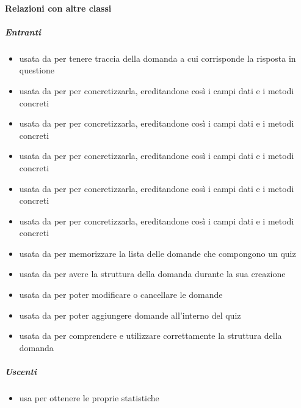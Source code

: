 \paragraph{Relazioni con altre classi}
\subparagraph{Entranti}
\begin{itemize}
\item usata da  per tenere traccia della domanda a cui corrisponde la risposta in questione
\item usata da  per per concretizzarla, ereditandone così i campi dati e i metodi concreti
\item usata da  per per concretizzarla, ereditandone così i campi dati e i metodi concreti
\item usata da  per per concretizzarla, ereditandone così i campi dati e i metodi concreti
\item usata da  per per concretizzarla, ereditandone così i campi dati e i metodi concreti
\item usata da  per per concretizzarla, ereditandone così i campi dati e i metodi concreti
\item usata da  per memorizzare la lista delle domande che compongono un quiz
\item usata da  per avere la struttura della domanda durante la sua creazione
\item usata da  per poter modificare o cancellare le domande
\item usata da  per poter aggiungere domande all'interno del quiz
\item usata da  per comprendere e utilizzare correttamente la struttura della domanda
\end{itemize}
\subparagraph{Uscenti}
\begin{itemize}
\item usa  per ottenere le proprie statistiche
\end{itemize}
